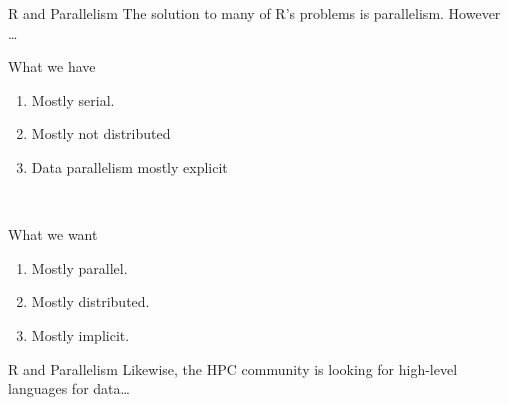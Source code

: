 \begin{frame}[shrink]
  \begin{block}{R and Parallelism}
    The solution to many of R's problems is parallelism.  However \dots\vspace{-.4cm}
   \begin{center}
    \begin{minipage}[t]{.95\textwidth}
    \begin{block}{\centering What we have}
      \begin{enumerate}[<+-|alert@+>]
        \item Mostly serial.
        \item Mostly not distributed
        \item Data parallelism mostly explicit
      \end{enumerate}
    \end{block}
    \end{minipage}
    \\\pause
    \begin{minipage}[t]{.95\textwidth}
    \begin{block}{\centering What we want}
      \begin{enumerate}[<+-|alert@+>]
        \item Mostly parallel.
        \item Mostly distributed.
        \item Mostly implicit.
      \end{enumerate}
    \end{block}
    \end{minipage}
    \end{center}
    \end{block}
\end{frame}



\begin{frame}
  \begin{block}{R and Parallelism}
    Likewise, the HPC community is looking for high-level languages for data\dots
    \end{block}
\end{frame}

